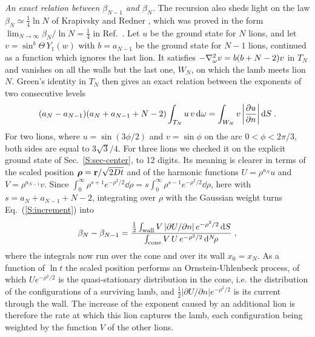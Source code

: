 \emph{An exact relation between $\beta_{N-1}$ and $\beta_N$.} The recursion also sheds light on the law $\beta_N \simeq \frac{1}{4} \ln N$ of Krapivsky and Redner \cite{KR96}, which was proved in the form $\lim_{N \to \infty} \beta_N/\ln N = \frac{1}{4}$ in Ref.~\cite{LS02}. Let $u$ be the ground state for $N$ lions, and let $v = \sin^b \Theta \, Y_1(w)$ with $b = a_{N-1}$ be the ground state for $N - 1$ lions, continued as a function which ignores the last lion. It satisfies $- \laplacian_\omega v = b (b + N - 2) v$ in $T_N$ and vanishes on all the walls but the last one, $W_N$, on which the lamb meets lion $N$. Green's identity in $T_N$ then gives an exact relation between the exponents of two consecutive levels
\begin{equation} \label{S:increment}
    (a_N - a_{N-1}) (a_N + a_{N-1} + N - 2) \int_{T_N} u \, v \, \dd \omega = \int_{W_N} v \left| \pdv{u}{n} \right| \dd S \;.
\end{equation}
For two lions, where $u = \sin(3\phi/2)$ and $v = \sin \phi$ on the arc $0 < \phi < 2\pi/3$, both sides are equal to $3 \sqrt{3}/4$. For three lions we checked it on the explicit ground state of Sec.~\ref{S:sec-center}, to 12 digits. Its meaning is clearer in terms of the scaled position $\bm{\rho} = \vb{r}/\sqrt{2 D t}$ and of the harmonic functions $U = \rho^{a_N} u$ and $V = \rho^{a_{N-1}} v$. Since $\int_0^\infty \rho^{s+1} e^{-\rho^2/2} \dd \rho = s \int_0^\infty \rho^{s-1} e^{-\rho^2/2} \dd \rho$, here with $s = a_N + a_{N-1} + N - 2$, integrating over $\rho$ with the Gaussian weight turns Eq.~(\ref{S:increment}) into
\begin{equation} \label{S:rate}
    \beta_N - \beta_{N-1} = \frac{\frac{1}{2} \int_{\rm wall} V \left| \partial U/\partial n \right| e^{-\rho^2/2} \, \dd S}{\int_{\rm cone} V \, U \, e^{-\rho^2/2} \, \dd^N \! \rho} \;,
\end{equation}
where the integrals now run over the cone and over its wall $x_0 = x_N$. As a function of $\ln t$ the scaled position performs an Ornstein-Uhlenbeck process, of which $U e^{-\rho^2/2}$ is the quasi-stationary distribution in the cone, i.e. the distribution of the configurations of a surviving lamb, and $\frac{1}{2} |\partial U/\partial n| e^{-\rho^2/2}$ is its current through the wall. The increase of the exponent caused by an additional lion is therefore the rate at which this lion captures the lamb, each configuration being weighted by the function $V$ of the other lions.

